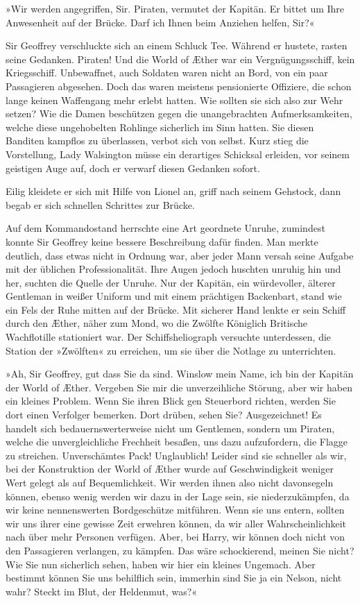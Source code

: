 »Wir werden angegriffen, Sir. Piraten, vermutet der Kapitän. Er
bittet um Ihre Anwesenheit auf der Brücke. Darf ich Ihnen beim
Anziehen helfen, Sir?«

Sir Geoffrey verschluckte sich an einem Schluck Tee. Während er
hustete, rasten seine Gedanken. Piraten! Und die World of Æther war
ein Vergnügungsschiff, kein Kriegsschiff. Unbewaffnet, auch
Soldaten waren nicht an Bord, von ein paar Passagieren abgesehen.
Doch das waren meistens pensionierte Offiziere, die schon lange
keinen Waffengang mehr erlebt hatten. Wie sollten sie sich also zur
Wehr setzen? Wie die Damen beschützen gegen die unangebrachten
Aufmerksamkeiten, welche diese ungehobelten Rohlinge sicherlich im
Sinn hatten. Sie diesen Banditen kampflos zu überlassen, verbot
sich von selbst. Kurz stieg die Vorstellung, Lady Walsington müsse
ein derartiges Schicksal erleiden, vor seinem geistigen Auge auf,
doch er verwarf diesen Gedanken sofort.

Eilig kleidete er sich mit Hilfe von Lionel an, griff nach seinem
Gehstock, dann begab er sich schnellen Schrittes zur Brücke.

\bigpar

Auf dem Kommandostand herrschte eine Art geordnete Unruhe,
zumindest konnte Sir Geoffrey keine bessere Beschreibung dafür
finden. Man merkte deutlich, dass etwas nicht in Ordnung war, aber
jeder Mann versah seine Aufgabe mit der üblichen Professionalität.
Ihre Augen jedoch huschten unruhig hin und her, suchten die Quelle
der Unruhe. Nur der Kapitän, ein würdevoller, älterer Gentleman in
weißer Uniform und mit einem prächtigen Backenbart, stand wie ein
Fels der Ruhe mitten auf der Brücke. Mit sicherer Hand lenkte er
sein Schiff durch den Æther, näher zum Mond, wo die Zwölfte
Königlich Britische Wachflotille stationiert war. Der
Schiffsheliograph versuchte unterdessen, die Station der »Zwölften«
zu erreichen, um sie über die Notlage zu unterrichten.

»Ah, Sir Geoffrey, gut dass Sie da sind. Winslow mein Name, ich bin
der Kapitän der World of Æther. Vergeben Sie mir die unverzeihliche
Störung, aber wir haben ein kleines Problem. Wenn Sie ihren Blick
gen Steuerbord richten, werden Sie dort einen Verfolger bemerken.
Dort drüben, sehen Sie? Ausgezeichnet! Es handelt sich
bedauernswerterweise nicht um Gentlemen, sondern um Piraten, welche
die unvergleichliche Frechheit besaßen, uns dazu aufzufordern, die
Flagge zu streichen. Unverschämtes Pack! Unglaublich! Leider sind
sie schneller als wir, bei der Konstruktion der World of Æther
wurde auf Geschwindigkeit weniger Wert gelegt als auf
Bequemlichkeit. Wir werden ihnen also nicht davonsegeln können,
ebenso wenig werden wir dazu in der Lage sein, sie niederzukämpfen,
da wir keine nennenswerten Bordgeschütze mitführen. Wenn sie uns
entern, sollten wir uns ihrer eine gewisse Zeit erwehren können, da
wir aller Wahrscheinlichkeit nach über mehr Personen verfügen.
Aber, bei Harry, wir können doch nicht von den Passagieren
verlangen, zu kämpfen. Das wäre schockierend, meinen Sie nicht? Wie
Sie nun sicherlich sehen, haben wir hier ein kleines Ungemach. Aber
bestimmt können Sie uns behilflich sein, immerhin sind Sie ja ein
Nelson, nicht wahr? Steckt im Blut, der Heldenmut, was?«

